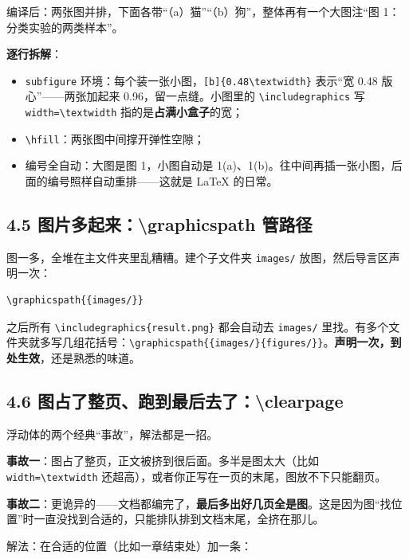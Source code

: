 编译后：两张图并排，下面各带“（a）猫”“（b）狗”，整体再有一个大图注“图 1：分类实验的两类样本”。

\textbf{逐行拆解}：

\begin{itemize}
\setlength{\itemsep}{2pt}
\item \texttt{subfigure} 环境：每个装一张小图，\texttt{[b]\{0.48\textbackslash{}textwidth\}} 表示“宽 0.48 版心”——两张加起来 0.96，留一点缝。小图里的 \texttt{\textbackslash{}includegraphics} 写 \texttt{width=\textbackslash{}textwidth} 指的是\textbf{占满小盒子}的宽；
\item \texttt{\textbackslash{}hfill}：两张图中间撑开弹性空隙；
\item 编号全自动：大图是图 1，小图自动是 1(a)、1(b)。往中间再插一张小图，后面的编号照样自动重排——这就是 LaTeX 的日常。
\end{itemize}

\subsection*{4.5 图片多起来：\textbackslash{}graphicspath 管路径}

图一多，全堆在主文件夹里乱糟糟。建个子文件夹 \texttt{images/} 放图，然后导言区声明一次：

\begin{lstlisting}
\graphicspath{{images/}}
\end{lstlisting}

之后所有 \texttt{\textbackslash{}includegraphics\{result.png\}} 都会自动去 \texttt{images/} 里找。有多个文件夹就多写几组花括号：\texttt{\textbackslash{}graphicspath\{\{images/\}\{figures/\}\}}。\textbf{声明一次，到处生效}，还是熟悉的味道。

\subsection*{4.6 图占了整页、跑到最后去了：\textbackslash{}clearpage}

浮动体的两个经典“事故”，解法都是一招。

\textbf{事故一}：图占了整页，正文被挤到很后面。多半是图太大（比如 \texttt{width=\textbackslash{}textwidth} 还超高），或者你正写在一页的末尾，图放不下只能翻页。

\textbf{事故二}：更诡异的——文档都编完了，\textbf{最后多出好几页全是图}。这是因为图“找位置”时一直没找到合适的，只能排队排到文档末尾，全挤在那儿。

解法：在合适的位置（比如一章结束处）加一条：


